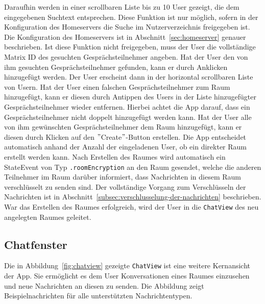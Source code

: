     Daraufhin werden in einer scrollbaren Liste bis zu 10 User gezeigt, die dem eingegebenen Suchtext entsprechen.
    Diese Funktion ist nur möglich, sofern in der Konfiguration des Homeservers die Suche im Nutzerverzeichnis freigegeben ist.
    Die Konfiguration des Homeservers ist in Abschnitt~\ref{sec:homeserver} genauer beschrieben.
    Ist diese Funktion nicht freigegeben, muss der User die vollständige Matrix ID des gesuchten Gesprächsteilnehmer angeben.
    Hat der User den von ihm gesuchten Gesprächsteilnehmer gefunden, kann er durch Anklicken hinzugefügt werden.
    Der User erscheint dann in der horizontal scrollbaren Liste von Usern.
    Hat der User einen falschen Gesprächsteilnehmer zum Raum hinzugefügt, kann er diesen durch Antippen des Users in der Liste hinzugefügter Gesprächsteilnehmer wieder entfernen.
    Hierbei achtet die App darauf, dass ein Gesprächsteilnehmer nicht doppelt hinzugefügt werden kann.
    Hat der User alle von ihm gewünschten Gesprächsteilnehmer dem Raum hinzugefügt, kann er diesen durch Klicken auf den \("\)Create\("\)-Button erstellen.
    Die App entscheidet automatisch anhand der Anzahl der eingeladenen User, ob ein direkter Raum erstellt werden kann.
    Nach Erstellen des Raumes wird automatisch ein StateEvent von Typ \texttt{.roomEncryption} an den Raum gesendet, welche die anderen Teilnehmer im Raum darüber informiert, dass Nachrichten in diesem Raum verschlüsselt zu senden sind.
    Der vollständige Vorgang zum Verschlüsseln der Nachrichten ist in Abschnitt~\ref{subsec:verschlusselung-der-nachrichten} beschrieben.
    War das Erstellen des Raumes erfolgreich, wird der User in die \texttt{ChatView} des neu angelegten Raumes geleitet.

    \newpage
    \subsection{Chatfenster}
    Die in Abbildung~\ref{fig:chatview} gezeigte \texttt{ChatView} ist eine weitere Kernansicht der App.
    Sie ermöglicht es dem User Konversationen eines Raumes einzusehen und neue Nachrichten an diesen zu senden.
    Die Abbildung zeigt Beispielnachrichten für alle unterstützten Nachrichtentypen.

